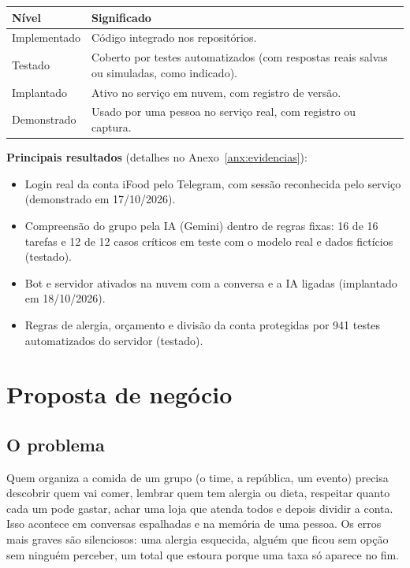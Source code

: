 \documentclass[11pt,a4paper]{article}
\newif\ifcenarioA
\newcommand{\preencher}[1]{\textcolor{destaque}{\textbf{[A PREENCHER: #1]}}}
\newcommand{\estado}[1]{\textsf{\small #1}}
\begin{document}
\begin{center}
\begin{tabularx}{\linewidth}{lY}
\toprule
\textbf{Nível} & \textbf{Significado} \\
\midrule
\estado{Implementado} & Código integrado nos repositórios. \\
\estado{Testado} & Coberto por testes automatizados (com respostas reais salvas ou simuladas, como indicado). \\
\estado{Implantado} & Ativo no serviço em nuvem, com registro de versão. \\
\estado{Demonstrado} & Usado por uma pessoa no serviço real, com registro ou captura. \\
\bottomrule
\end{tabularx}
\end{center}

\textbf{Principais resultados} (detalhes no Anexo~\ref{anx:evidencias}):
\begin{itemize}
  \item Login real da conta iFood pelo Telegram, com sessão reconhecida pelo serviço \estado{(demonstrado em 17/10/2026)}.
  \item Compreensão do grupo pela IA (Gemini) dentro de regras fixas: 16 de 16 tarefas e 12 de 12 casos críticos em teste com o modelo real e dados fictícios \estado{(testado)}.
  \item Bot e servidor ativados na nuvem com a conversa e a IA ligadas \estado{(implantado em 18/10/2026)}.
  \item Regras de alergia, orçamento e divisão da conta protegidas por 941 testes automatizados do servidor \estado{(testado)}.
\ifcenarioA
  \item Preparação do carrinho real após confirmação humana \estado{(demonstrado: \preencher{data, versão e registro do ensaio})}.
\fi
\end{itemize}

\section{Proposta de negócio}

\subsection{O problema}
Quem organiza a comida de um grupo (o time, a república, um evento) precisa descobrir quem vai comer, lembrar quem tem alergia ou dieta, respeitar quanto cada um pode gastar, achar uma loja que atenda todos e depois dividir a conta. Isso acontece em conversas espalhadas e na memória de uma pessoa. Os erros mais graves são silenciosos: uma alergia esquecida, alguém que ficou sem opção sem ninguém perceber, um total que estoura porque uma taxa só aparece no fim.
\end{document}
